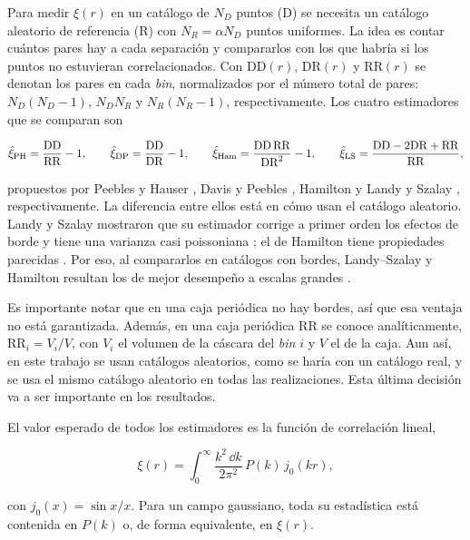 \documentclass[letterpaper, 12pt]{article}
\newcommand{\DD}{\mathrm{DD}}
\newcommand{\DR}{\mathrm{DR}}
\newcommand{\RR}{\mathrm{RR}}
\begin{document}
            Para medir $\xi(r)$ en un catálogo de $N_D$ puntos (D) se necesita un catálogo aleatorio de referencia (R) con $N_R = \alpha N_D$ puntos uniformes. La idea es contar cuántos pares hay a cada separación y compararlos con los que habría si los puntos no estuvieran correlacionados. Con $\DD(r)$, $\DR(r)$ y $\RR(r)$ se denotan los pares en cada \emph{bin}, normalizados por el número total de pares: $N_D(N_D-1)$, $N_DN_R$ y $N_R(N_R-1)$, respectivamente. Los cuatro estimadores que se comparan son

            \begin{equation}\label{eq:estimadores}
                \hat\xi_{\rm PH} = \frac{\DD}{\RR} - 1, \qquad
                \hat\xi_{\rm DP} = \frac{\DD}{\DR} - 1, \qquad
                \hat\xi_{\rm Ham} = \frac{\DD\,\RR}{\DR^2} - 1, \qquad
                \hat\xi_{\rm LS} = \frac{\DD - 2\DR + \RR}{\RR},
            \end{equation}

            propuestos por Peebles y Hauser \cite{peebles_hauser}, Davis y Peebles \cite{davis_peebles}, Hamilton \cite{hamilton} y Landy y Szalay \cite{landy_szalay}, respectivamente. La diferencia entre ellos está en cómo usan el catálogo aleatorio. Landy y Szalay mostraron que su estimador corrige a primer orden los efectos de borde y tiene una varianza casi poissoniana \cite{landy_szalay}; el de Hamilton tiene propiedades parecidas \cite{hamilton}. Por eso, al compararlos en catálogos con bordes, Landy--Szalay y Hamilton resultan los de mejor desempeño a escalas grandes \cite{kerscher}.

            Es importante notar que en una caja periódica no hay bordes, así que esa ventaja no está garantizada. Además, en una caja periódica $\RR$ se conoce analíticamente, $\RR_i = V_i/V$, con $V_i$ el volumen de la cáscara del \emph{bin} $i$ y $V$ el de la caja. Aun así, en este trabajo se usan catálogos aleatorios, como se haría con un catálogo real, y se usa el mismo catálogo aleatorio en todas las realizaciones. Esta última decisión va a ser importante en los resultados.

            El valor esperado de todos los estimadores es la función de correlación lineal,

            \begin{equation}\label{eq:xi_teo}
                \xi(r) = \int_0^\infty \frac{k^2\,\dd k}{2\pi^2}\, P(k)\, j_0(kr),
            \end{equation}

            con $j_0(x) = \sin x/x$. Para un campo gaussiano, toda su estadística está contenida en $P(k)$ o, de forma equivalente, en $\xi(r)$.
\end{document}

